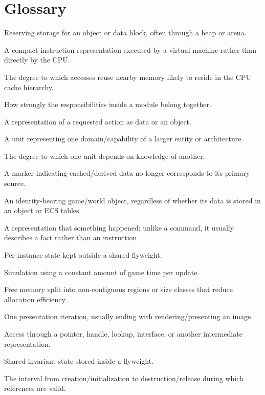 \documentclass[11pt]{article}
\begin{document}
\section{Glossary}\label{sec:glossary}
\begin{description}[leftmargin=3.7cm,style=nextline]
\item[Allocation] Reserving storage for an object or data block, often through a heap or arena.
\item[Bytecode] A compact instruction representation executed by a virtual machine rather than directly by the CPU.
\item[Cache locality] The degree to which accesses reuse nearby memory likely to reside in the CPU cache hierarchy.
\item[Cohesion] How strongly the responsibilities inside a module belong together.
\item[Command] A representation of a requested action as data or an object.
\item[Component] A unit representing one domain/capability of a larger entity or architecture.
\item[Coupling] The degree to which one unit depends on knowledge of another.
\item[Dirty state] A marker indicating cached/derived data no longer corresponds to its primary source.
\item[Entity] An identity-bearing game/world object, regardless of whether its data is stored in an object or ECS tables.
\item[Event] A representation that something happened; unlike a command, it usually describes a fact rather than an instruction.
\item[Extrinsic state] Per-instance state kept outside a shared flyweight.
\item[Fixed timestep] Simulation using a constant amount of game time per update.
\item[Fragmentation] Free memory split into non-contiguous regions or size classes that reduce allocation efficiency.
\item[Frame] One presentation iteration, usually ending with rendering/presenting an image.
\item[Indirection] Access through a pointer, handle, lookup, interface, or another intermediate representation.
\item[Intrinsic state] Shared invariant state stored inside a flyweight.
\item[Object lifetime] The interval from creation/initialization to destruction/release during which references are valid.

\end{description}
\end{document}
